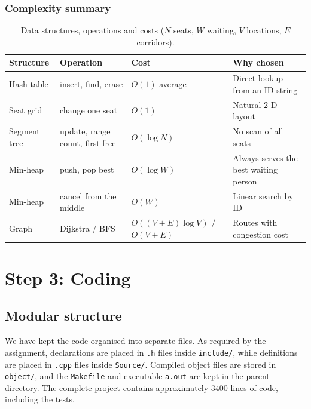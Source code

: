 \documentclass[11pt,a4paper]{article}
\newcommand{\code}[1]{\texttt{#1}}
\begin{document}
\subsubsection*{Complexity summary}
\begin{table}[ht]
\centering
\small
\begin{tabularx}{\textwidth}{@{}>{\raggedright\arraybackslash}p{2.3cm}>{\raggedright\arraybackslash}p{4.4cm}>{\raggedright\arraybackslash}p{3.3cm}>{\raggedright\arraybackslash}X@{}}
\toprule
\textbf{Structure} & \textbf{Operation} & \textbf{Cost} & \textbf{Why chosen}\\
\midrule
Hash table & insert, find, erase & $O(1)$ average & Direct lookup from an ID string\\
Seat grid & change one seat & $O(1)$ & Natural 2-D layout\\
Segment tree & update, range count, first free & $O(\log N)$ & No scan of all seats\\
Min-heap & push, pop best & $O(\log W)$ & Always serves the best waiting person\\
Min-heap & cancel from the middle & $O(W)$ & Linear search by ID\\
Graph & Dijkstra / BFS & $O((V{+}E)\log V)$ / $O(V{+}E)$ & Routes with congestion cost\\
\bottomrule
\end{tabularx}
\caption{Data structures, operations and costs ($N$ seats, $W$ waiting, $V$ locations, $E$ corridors).}
\end{table}

\section{Step 3: Coding}

\subsection{Modular structure}
We have kept the code organised into separate files. As required by the
assignment, declarations are placed in \code{.h} files inside \code{include/},
while definitions are placed in \code{.cpp} files inside \code{Source/}.
Compiled object files are stored in \code{object/}, and the \code{Makefile} and
executable \code{a.out} are kept in the parent directory. The complete project
contains approximately 3400 lines of code, including the tests.
\end{document}
